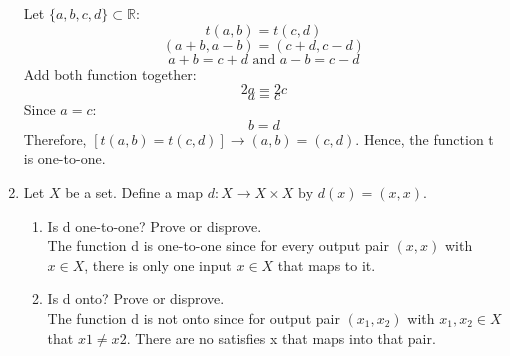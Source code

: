 \documentclass[12pt]{article}
\begin{document}
\begin{enumerate}
      Let $\{a,b,c,d\} \subset \mathds{R}$:
            \[t(a,b) = t(c,d)\]
            \[(a+b,a-b) = (c+d,c-d)\]
            \[a+b = c+d \text{ and } a-b = c-d\]
      Add both function together:
            \[2a = 2c\]
            \[a = c\]
      Since $a=c$:
            \[b=d\]
      Therefore, $[t(a,b) = t(c,d)] \rightarrow (a,b) = (c,d)$. Hence, the function t is one-to-one.
      \item Let $X$ be a set. Define a map $d: X \rightarrow X \times X \text{ by } d(x) = (x, x)$.
            \begin{enumerate}
                  \item Is d one-to-one? Prove or disprove.\\
                  The function d is one-to-one since for every output pair $(x,x)$ with $x \in X$, there is only one input $x \in X$ that maps to it.
                  \item Is d onto? Prove or disprove.\\
                  The function d is not onto since for output pair $(x_1,x_2)$ with $x_1,x_2 \in X$ that $x1 \neq x2$. There are no satisfies x that maps into that pair.

            \end{enumerate}
\end{enumerate}
\end{document}
